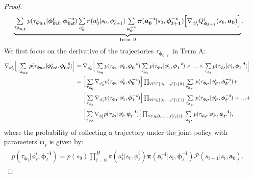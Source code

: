 \begin{proof}
\begin{align}
&\;\;\;\;\:\underbrace{\textstyle\sum\limits_{\tau_{\bm{\phi}_{\bm{0:\ell}}}} p(\tau_{\bm{\phi}_{\bm{0:\ell}}}|\bm{\phi}^{\bm{i}}_{\bm{0:\ell}},\bm{\phi}^{\bm{-i}}_{\bm{0:\ell}})\textstyle\sum\limits_{a^{i}_{0}}\pi(a^{i}_{0}|s_0,\phi^{i}_{\ell+1})\textstyle\sum\limits_{\bm{a}^{\bm{-i}}_{\bm{0}}}\bm{\pi}(\bm{a}^{\bm{-i}}_{\bm{0}}|s_{0},\bm{\phi}^{\bm{-i}}_{\bm{\ell+1}})\Big[\nabla_{\phi^{i}_{0}}Q^{i}_{\bm{\phi}_{\bm{\ell+1}}}(s_{0},\bm{a}_{\bm{0}})\Big]}_{\text{Term D}}\nonumber.
\end{align}
We first focus on the derivative of the trajectories $\tau_{\bm{\phi}_{\bm{0:\ell}}}$ in Term A:
\begin{align}\label{eqn:theorem-step4}
\begin{split}
\nabla_{\phi^{i}_{0}}\Big[\smallsum_{\tau_{\bm{\phi}_{\bm{0:\ell}}}} p(\tau_{\bm{\phi}_{\bm{0:\ell}}}|\bm{\phi}^{\bm{i}}_{\bm{0:\ell}},\bm{\phi}^{\bm{-i}}_{\bm{0:\ell}})\Big]&=\nabla_{\phi^{i}_{0}}\Big[\smallsum_{\tau_{\bm{\phi}_{\bm{0}}}} p(\tau_{\bm{\phi}_{\bm{0}}}|\phi^{i}_{0},\bm{\phi}^{\bm{-i}}_{\bm{0}})\smallsum_{\tau_{\bm{\phi}_{\bm{1}}}} p(\tau_{\bm{\phi}_{\bm{1}}}|\phi^{i}_{1},\bm{\phi}^{\bm{-i}}_{\bm{1}})\times\sdots\times\smallsum_{\tau_{\bm{\phi}_{\bm{\ell}}}} p(\tau_{\bm{\phi}_{\bm{\ell}}}|\phi^{i}_{\ell},\bm{\phi}^{\bm{-i}}_{\bm{\ell}})\Big]\\
&=\Big[\smallsum_{\tau_{\bm{\phi}_{\bm{0}}}}\nabla_{\phi^{i}_{0}} p(\tau_{\bm{\phi}_{\bm{0}}}|\phi^{i}_{0},\bm{\phi}^{\bm{-i}}_{\bm{0}})\Big]\textstyle\prod_{\forall\ell'\in\{0,\sdots,\ell\}\setminus \{0\}}\smallsum_{\tau_{\bm{\phi}_{\bm{\ell'}}}} p(\tau_{\bm{\phi}_{\bm{\ell'}}}|\phi^{i}_{\ell'},\bm{\phi}^{\bm{-i}}_{\bm{\ell'}})+\\
&\;\;\;\;\:\Big[\smallsum_{\tau_{\bm{\phi}_{\bm{1}}}}\nabla_{\phi^{i}_{1}} p(\tau_{\bm{\phi}_{\bm{1}}}|\phi^{i}_{1},\bm{\phi}^{\bm{-i}}_{\bm{1}})\Big]\textstyle\prod_{\forall\ell'\in\{0,\sdots,\ell\}\setminus \{1\}}\smallsum_{\tau_{\bm{\phi}_{\bm{\ell'}}}} p(\tau_{\bm{\phi}_{\bm{\ell'}}}|\phi^{i}_{\ell'},\bm{\phi}^{\bm{-i}}_{\bm{\ell'}})+\sdots+\\
&\;\;\;\;\:\Big[\smallsum_{\tau_{\bm{\phi}_{\bm{\ell}}}}\nabla_{\phi^{i}_{\ell}} p(\tau_{\bm{\phi}_{\bm{\ell}}}|\phi^{i}_{\ell},\bm{\phi}^{\bm{-i}}_{\bm{\ell}})\Big]\textstyle\prod_{\forall\ell'\in\{0,\sdots,\ell\}\setminus \{\ell\}}\smallsum_{\tau_{\bm{\phi}_{\bm{\ell'}}}} p(\tau_{\bm{\phi}_{\bm{\ell'}}}|\phi^{i}_{\ell'},\bm{\phi}^{\bm{-i}}_{\bm{\ell'}}),
\end{split}
\end{align}
where the probability of collecting a trajectory under the joint policy with parameters $\bm{\phi}_{\bm{\ell}}$ is given by:
\begin{align}\label{eqn:theorem-step5}
\begin{split}
p(\tau_{\bm{\phi}_{\bm{\ell}}}|\phi^{i}_{\ell},\bm{\phi}^{\bm{-i}}_{\bm{\ell}})=p(s_0)\textstyle\prod\nolimits_{t=0}^{H}\pi(a^{i}_{t}|s_{t},\phi^{i}_{\ell})\bm{\pi}(\bm{a}^{\bm{-i}}_{\bm{t}}|s_{t},\bm{\phi}^{\bm{-i}}_{\bm{\ell}})\mathcal{P}(s_{t+1}|s_{t},\bm{a}_{\bm{t}}).
\end{split}
\end{align}


\end{proof}
